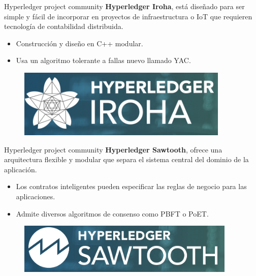 \documentclass{beamer}
\begin{document}
	\begin{frame}
		\begin{block}{Hyperledger project community}
			\textbf{Hyperledger Iroha}, está diseñado para ser simple y fácil de incorporar en proyectos de infraestructura o IoT que requieren tecnología de contabilidad distribuida.
			\begin{itemize}
				\item Construcción y diseño en C++ modular. 
				\item Usa un algoritmo tolerante a fallas nuevo llamado YAC.
			\end{itemize}
			\begin{figure}[h]
				\includegraphics[scale=.3]{iroha_logo}
				\centering
			\end{figure}
		\end{block}
	\end{frame}

	\begin{frame}
		\begin{block}{Hyperledger project community}
			\textbf{Hyperledger Sawtooth}, ofrece una arquitectura flexible y modular que separa el sistema central del dominio de la aplicación.
			\begin{itemize}
				\item Los contratos inteligentes pueden especificar las reglas de negocio para las aplicaciones.
				\item Admite diversos algoritmos de consenso como PBFT o PoET.
			\end{itemize}
			\begin{figure}[h]
				\includegraphics[scale=.3]{sawtooth_logo}
				\centering
			\end{figure}
		\end{block}
	\end{frame}
\end{document}
